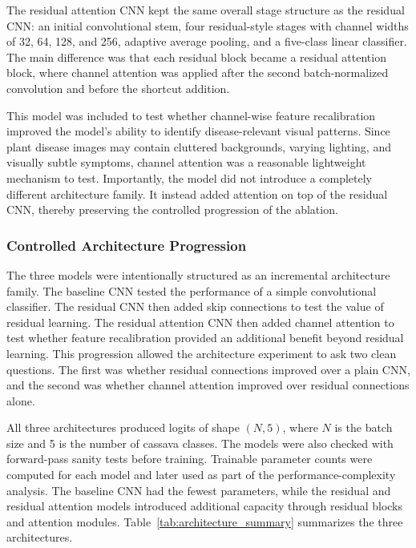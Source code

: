 \documentclass[11pt]{article}
\begin{document}
The residual attention CNN kept the same overall stage structure as the residual CNN: an initial convolutional stem, four residual-style stages with channel widths of 32, 64, 128, and 256, adaptive average pooling, and a five-class linear classifier. The main difference was that each residual block became a residual attention block, where channel attention was applied after the second batch-normalized convolution and before the shortcut addition.

This model was included to test whether channel-wise feature recalibration improved the model's ability to identify disease-relevant visual patterns. Since plant disease images may contain cluttered backgrounds, varying lighting, and visually subtle symptoms, channel attention was a reasonable lightweight mechanism to test. Importantly, the model did not introduce a completely different architecture family. It instead added attention on top of the residual CNN, thereby preserving the controlled progression of the ablation.

\subsubsection{Controlled Architecture Progression}

The three models were intentionally structured as an incremental architecture family. The baseline CNN tested the performance of a simple convolutional classifier. The residual CNN then added skip connections to test the value of residual learning. The residual attention CNN then added channel attention to test whether feature recalibration provided an additional benefit beyond residual learning. This progression allowed the architecture experiment to ask two clean questions. The first was whether residual connections improved over a plain CNN, and the second was whether channel attention improved over residual connections alone.

All three architectures produced logits of shape \((N, 5)\), where \(N\) is the batch size and 5 is the number of cassava classes. The models were also checked with forward-pass sanity tests before training. Trainable parameter counts were computed for each model and later used as part of the performance-complexity analysis. The baseline CNN had the fewest parameters, while the residual and residual attention models introduced additional capacity through residual blocks and attention modules. Table~\ref{tab:architecture_summary} summarizes the three architectures.
\end{document}
